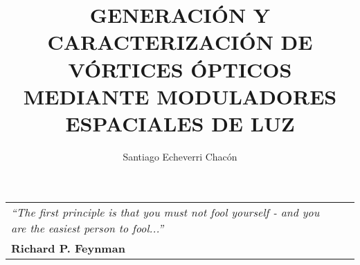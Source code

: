 \documentclass[11pt,spanish, twoside]{SETUP/ezthesis}
\author{Santiago Echeverri Chacón}
\title{GENERACIÓN Y CARACTERIZACIÓN DE VÓRTICES
                  ÓPTICOS MEDIANTE MODULADORES ESPACIALES DE LUZ}
\begin{document}


\frontmatter

\clearpage


\vspace*{5cm}
\begin{flushright}
\begin{tabular}{p{10cm}r}
\emph{``The first principle is that you must not fool yourself - and you are the easiest person to fool...''} \\
\textbf{Richard P. Feynman}
\end{tabular}
\end{flushright}
\thispagestyle{empty}






\setcounter{secnumdepth}{5} %
\setcounter{tocdepth}{5}    %
\tableofcontents
\listoffigures

% 
% 
% 

% 
% 
% 
% 
% 





\label{sec:glossary} %
\printglossary[title=Lista de Acr\'onimos,toctitle=Lista de Acr\'onimos]



\end{document}
